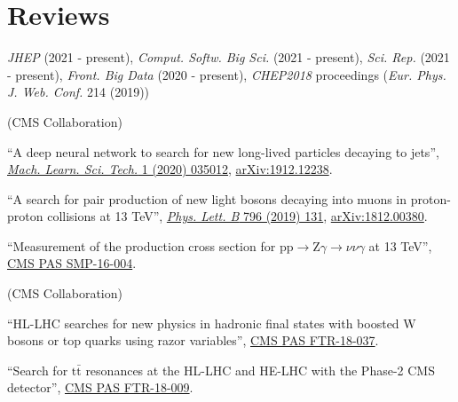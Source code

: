 \section{Reviews}
\begin{description}[leftmargin=12pt,font=\normalfont\textit]
\item[Journal referee:]
\begin{description}[leftmargin=12pt,font=\normalfont,labelsep=0em]\item[]
\item \emph{JHEP} (2021 - present), \emph{Comput. Softw. Big Sci.} (2021 - present), \emph{Sci. Rep.} (2021 - present), \emph{Front. Big Data} (2020 - present), \emph{CHEP2018} proceedings (\emph{Eur. Phys. J. Web. Conf.} 214 (2019))
\end{description}
\item[Analysis Review Committee (ARC) member:] (CMS Collaboration)
\begin{description}[leftmargin=12pt,font=\normalfont,labelsep=0em]
\item ``A deep neural network to search for new long-lived particles decaying to jets'', \href{https://doi.org/10.1088/2632-2153/ab9023}{\emph{Mach. Learn. Sci. Tech.} 1 (2020) 035012}, \href{https://arxiv.org/abs/1912.12238}{arXiv:1912.12238}.
\item \begin{sloppypar}``A search for pair production of new light bosons decaying into muons in proton-proton collisions at 13 TeV'', \href{http://dx.doi.org/10.1016/j.physletb.2019.07.013}{\emph{Phys. Lett. B} 796 (2019) 131}, \href{https://arxiv.org/abs/1812.00380}{arXiv:1812.00380}.\end{sloppypar}
\item ``Measurement of the production cross section for $\text{p}\text{p} \to \text{Z}\gamma \to \nu\nu\gamma$ at 13 TeV'', \href{https://cds.cern.ch/record/2204922}{CMS PAS SMP-16-004}.
\end{description}
\item[CMS Certified Language Editor (CCLE):] (CMS Collaboration)
\begin{description}[leftmargin=12pt,font=\normalfont,labelsep=0em]
\item ``HL-LHC searches for new physics in hadronic final states with boosted W bosons or top quarks using razor variables'', \href{https://cds.cern.ch/record/2658262}{CMS PAS FTR-18-037}.
\item ``Search for $\text{t}\bar{\text{t}}$ resonances at the HL-LHC and HE-LHC with the Phase-2 CMS detector'', \href{https://cds.cern.ch/record/2649032}{CMS PAS FTR-18-009}.

\end{description}
\end{description}
